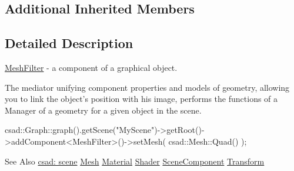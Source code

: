 \subsection*{Additional Inherited Members}


\subsection{Detailed Description}
\hyperlink{classcsad_1_1_mesh_filter}{Mesh\-Filter} -\/ a component of a graphical object. 

The mediator unifying component properties and models of geometry, allowing you to link the object's position with his image, performs the functions of a Manager of a geometry for a given object in the scene.

\begin{DoxyVerb}  csad::Graph::graph().getScene("MyScene")->getRoot()->addComponent<MeshFilter>()->setMesh( csad::Mesh::Quad() );
\end{DoxyVerb}


\begin{DoxySeeAlso}{See Also}
\hyperlink{group__scene}{csad\-: scene} \hyperlink{classcsad_1_1_mesh}{Mesh} \hyperlink{classcsad_1_1_material}{Material} \hyperlink{classcsad_1_1_shader}{Shader} \hyperlink{classcsad_1_1_scene_component}{Scene\-Component} \hyperlink{classcsad_1_1_transform}{Transform} 
\end{DoxySeeAlso}
